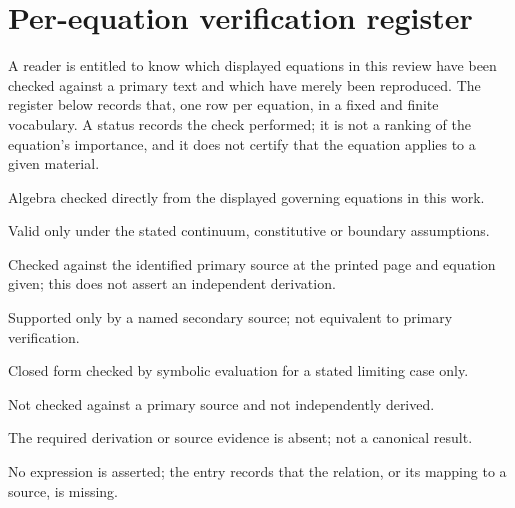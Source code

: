 \section{Per-equation verification register}\label{sec:eqregister}

A reader is entitled to know which displayed equations in this review have been checked against a
primary text and which have merely been reproduced. The register below records that, one row per
equation, in a fixed and finite vocabulary. A status records the check performed; it is not a
ranking of the equation's importance, and it does not certify that the equation applies to a given
material.

\begin{description}[leftmargin=1.6em,style=nextline]
\item[DERIVED] Algebra checked directly from the displayed governing equations in this work.
\item[CONDITIONAL] Valid only under the stated continuum, constitutive or boundary assumptions.
\item[PRIMARY-SOURCE-CHECKED] Checked against the identified primary source at the printed page and
  equation given; this does not assert an independent derivation.
\item[SECONDARY-SOURCE] Supported only by a named secondary source; not equivalent to primary verification.
\item[VERIFIED-SYMBOLIC] Closed form checked by symbolic evaluation for a stated limiting case only.
\item[UNVERIFIED] Not checked against a primary source and not independently derived.
\item[OPEN] The required derivation or source evidence is absent; not a canonical result.
\item[WITHHELD] No expression is asserted; the entry records that the relation, or its mapping to a
  source, is missing.
\end{description}

